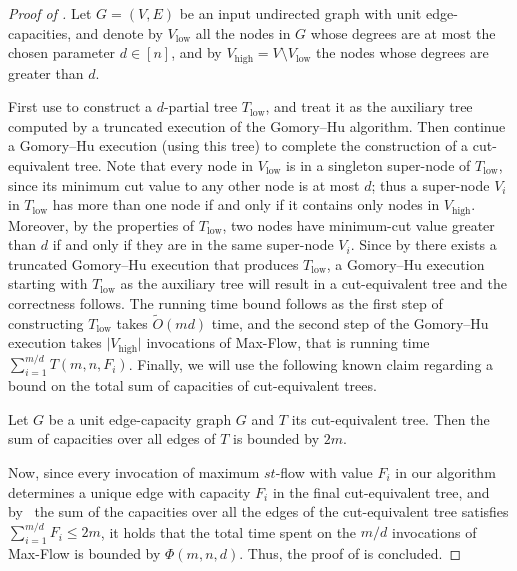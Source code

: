 \documentclass{toc}
\theoremstyle{plain}
\newcommand{\ProblemName}[1]{\textsf{#1}}
\newcommand{\MF}{\ProblemName{Max-Flow}\xspace}
\newcommand\tO{\ensuremath{\widetilde O}}  %
\providecommand{\card}[1]{\lvert#1\rvert}
\begin{document}
\begin{proof}[Proof of ]
Let $G=(V,E)$ be an input undirected graph with unit edge-capacities,
and denote by $V_{\mathrm{low}}$ all the nodes in $G$ whose degrees are at most
the chosen parameter $d\in [n]$,
and by $V_{\mathrm{high}}=V\setminus V_{\mathrm{low}}$ the nodes whose degrees are greater than $d$.

First use  to construct a $d$-partial tree $T_{\mathrm{low}}$,
and treat it as the auxiliary tree computed by a truncated execution
of the Gomory--Hu algorithm.
Then continue a Gomory--Hu execution (using this tree)
to complete the construction of a cut-equivalent tree.
Note that every node in $V_{\mathrm{low}}$ is in a singleton super-node of $T_{\mathrm{low}}$, since its minimum cut value to any other node is at most $d$; thus a super-node $V_i$ in $T_{\mathrm{low}}$ has more than one node if and only if it contains only nodes in $V_{\mathrm{high}}$.
Moreover, by the properties of $T_{\mathrm{low}}$, two nodes have minimum-cut value greater than $d$ if and only if they are in the same super-node $V_i$.
Since by  there exists a truncated Gomory--Hu execution that produces $T_{\mathrm{low}}$, a Gomory--Hu execution starting with $T_{\mathrm{low}}$ as the auxiliary tree will result in a cut-equivalent tree and the correctness follows.
The running time bound follows as the first step of constructing $T_{\mathrm{low}}$ takes $\tO( m d )$ time,
and the second step of the Gomory--Hu execution
takes $\card{V_{\mathrm{high}}}$ invocations of \MF, that is running time $\sum_{i=1}^{m/d}T(m,n,F_i)$.
Finally, we will use the following known claim regarding a bound on the total sum of capacities of cut-equivalent trees.
\begin{claim}\label{tree_bound}
Let $G$ be a unit edge-capacity graph $G$ and $T$ its cut-equivalent tree. Then the sum of capacities over all edges of $T$ is bounded by $2m$.
\end{claim}
Now, since every invocation of maximum $st$-flow with value $F_i$ in our algorithm determines a unique edge with capacity $F_i$ in the final cut-equivalent tree, and by~ the sum of the capacities over all the edges of the cut-equivalent tree satisfies
$\sum_{i=1}^{m/d} F_i\leq 2m$,
it holds that the total time spent on the $m/d$ invocations of \MF is bounded by $\Phi(m,n,d)$.
Thus, the proof of  is concluded.
\end{proof}
\end{document}
